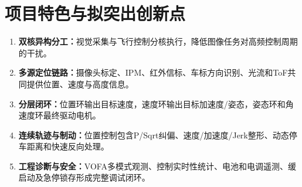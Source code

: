 \section{项目特色与拟突出创新点}

\begin{enumerate}
  \item \textbf{双核异构分工：}视觉采集与飞行控制分核执行，降低图像任务对高频控制周期的干扰。
  \item \textbf{多源定位链路：}摄像头标定、IPM、红外信标、车标方向识别、光流和ToF共同提供位置、速度与高度信息。
  \item \textbf{分层闭环：}位置环输出目标速度，速度环输出目标加速度/姿态，姿态环和角速度环最终驱动电机。
  \item \textbf{连续轨迹与制动：}位置控制包含P/Sqrt纠偏、速度/加速度/Jerk整形、动态停车距离和快速反向处理。
  \item \textbf{工程诊断与安全：}VOFA多模式观测、控制实时性统计、电池和电调遥测、缓启动及急停锁存形成完整调试闭环。
\end{enumerate}

